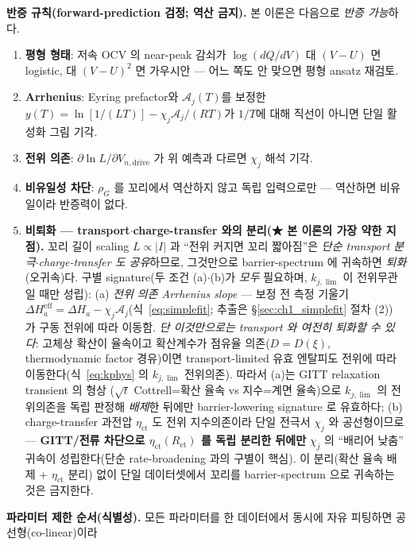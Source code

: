 \documentclass[11pt,a4paper]{article}
\newcommand{\eff}{\mathrm{eff}}
\newcommand{\drive}{\mathrm{drive}}
\begin{document}
\textbf{반증 규칙(forward-prediction 검정; 역산 금지).} 본 이론은 다음으로 \emph{반증 가능}하다.
\begin{enumerate}[label=(N\arabic*),leftmargin=2.4em]
\item \textbf{평형 형태}: 저속 OCV 의 near-peak 감쇠가 $\log(dQ/dV)$ 대 $(V-U)$ 면 logistic, 대 $(V-U)^2$
  면 가우시안 — 어느 쪽도 안 맞으면 평형 ansatz 재검토.
\item \textbf{Arrhenius}: Eyring prefactor와 $\mathcal A_j(T)$를 보정한 $y(T)=\ln[1/(LT)]-\chi_j\mathcal A_j/(RT)$가 $1/T$에 대해 직선이 아니면 단일 활성화 그림 기각.
\item \textbf{전위 의존}: $\partial\ln L/\partial V_{n,\drive}$ 가 위 예측과 다르면 $\chi_j$ 해석 기각.
\item \textbf{비유일성 차단}: $\rho_G$ 를 꼬리에서 역산하지 않고 독립 입력으로만 — 역산하면 비유일이라
  반증력이 없다.
\item \textbf{비퇴화 — transport$\cdot$charge-transfer 와의 분리(★ 본 이론의 가장 약한 지점).} 꼬리 길이 scaling
  $L\propto|I|$ 과 ``전위 커지면 꼬리 짧아짐''은 \emph{단순 transport 분극$\cdot$charge-transfer 도 공유}하므로,
  그것만으로 barrier-spectrum 에 귀속하면 \emph{퇴화}(오귀속)다. 구별 signature(두 조건 (a)$\cdot$(b)가 \emph{모두}
  필요하며, $k_{j,\lim}$ 이 전위무관일 때만 성립): (a) \emph{전위 의존 Arrhenius slope} — 보정 전 측정 기울기
  $\Delta H_a^{\eff}=\Delta H_a-\chi_j\mathcal A_j$(식~\eqref{eq:simplefit}; 추출은 \S\ref{sec:ch1_simplefit} 절차 (2))
  가 구동 전위에 따라 이동함. \emph{단 이것만으로는 transport 와 여전히 퇴화할 수 있다}: 고체상 확산이 율속이고
  확산계수가 점유율 의존($D=D(\xi)$, thermodynamic factor 경유)이면 transport-limited 유효 엔탈피도 전위에 따라
  이동한다(식~\eqref{eq:kphys} 의 $k_{j,\lim}$ 전위의존). 따라서 (a)는 GITT relaxation transient 의 형상
  ($\sqrt t$ Cottrell=확산 율속 vs 지수=계면 율속)으로 $k_{j,\lim}$ 의 전위의존을 독립 판정해 \emph{배제}한 뒤에만
  barrier-lowering signature 로 유효하다; (b) charge-transfer 과전압 $\eta_{\mathrm{ct}}$ 도 전위 지수의존이라 단일
  전극서 $\chi_j$ 와 공선형이므로 — \textbf{GITT/전류 차단으로 $\eta_{\mathrm{ct}}(R_{\mathrm{ct}})$ 를 독립 분리한
  뒤에만} $\chi_j$ 의 ``배리어 낮춤'' 귀속이 성립한다(단순 rate-broadening \cite{dubarry2022,fly2020} 과의 구별이
  핵심). 이 분리(확산 율속 배제 + $\eta_{\mathrm{ct}}$ 분리) 없이 단일 데이터셋에서 꼬리를 barrier-spectrum 으로
  귀속하는 것은 금지한다.
\end{enumerate}
\textbf{파라미터 제한 순서(식별성).} 모든 파라미터를 한 데이터에서 동시에 자유 피팅하면 공선형(co-linear)이라
\end{document}
